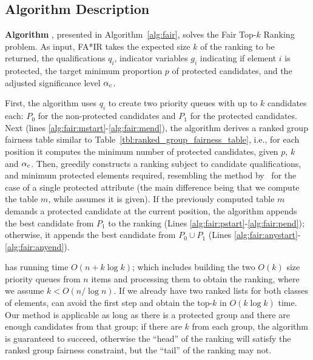 \subsection{Algorithm Description}\label{subsec:algorithm-description}

\textbf{Algorithm \algoFAIRBF}, presented in Algorithm~\ref{alg:fair}, solves the {\sc Fair Top-$k$ Ranking} problem.
%
As input, FA*IR takes 
the expected size $k$ of the ranking to be returned,
the qualifications $q_i$, 
indicator variables $g_i$ indicating if element $i$ is protected,
the target minimum proportion $p$ of protected candidates, and
the adjusted significance level $\alpha_c$.

First, the algorithm uses $q_i$ to create two priority queues with up to $k$ candidates each: $P_0$ for the non-protected candidates and $P_1$ for the protected candidates.
%
Next (lines \ref{alg:fair:mstart}-\ref{alg:fair:mend}), the algorithm derives a ranked group fairness table similar to Table~\ref{tbl:ranked_group_fairness_table}, i.e., for each position it computes the minimum number of protected candidates, given $p$, $k$ and $\alpha_c$.
%
Then, \algoFAIR greedily constructs a ranking subject to candidate qualifications, and minimum protected elements required, resembling the method by~\citet{celis2017ranking} for the case of a single protected attribute (the main difference being that we compute the table $m$, while \cite{celis2017ranking} assumes it is given).
%
If the previously computed table $m$ demands a protected candidate at the current position, the algorithm appends the best candidate from $P_1$ to the ranking (Lines \ref{alg:fair:pstart}-\ref{alg:fair:pend}); otherwise, it appends the best candidate from $P_0 \cup P_1$ (Lines \ref{alg:fair:anystart}-\ref{alg:fair:anyend}).

\algoFAIR has running time $O(n + k \log k)$; which includes building the two $O(k)$ size priority queues from $n$ items and processing them to obtain the ranking, where we assume $k < O(n/\log n)$. 
%
If we already have two ranked lists for both classes of elements, \algoFAIR can avoid the first step and obtain the top-$k$ in $O(k \log k)$ time.
%
Our method is applicable as long as there is a protected group and there are enough candidates from that group; if there are $k$ from each group, the algorithm is guaranteed to succeed, otherwise the ``head'' of the ranking will satisfy the ranked group fairness constraint, but the ``tail'' of the ranking may not.

